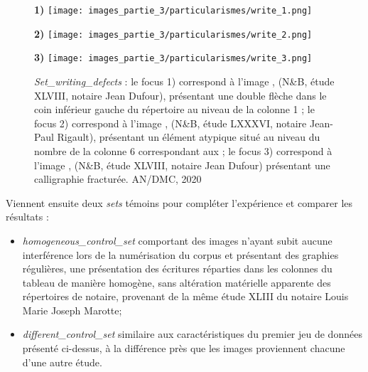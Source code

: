 \newpage
\begin{figure}[H]
    \begin{minipage}[c]{.46\linewidth} 
        \centering
        \textbf{1)}
        \texttt{[image: images\_partie\_3/particularismes/write\_1.png]}
        \end{minipage}
    \hfill%
    \begin{minipage}[c]{.46\linewidth}
        \centering
        \textbf{2)}
        \texttt{[image: images\_partie\_3/particularismes/write\_2.png]}
    \end{minipage}
    \hfill%
    \begin{minipage}[c]{.46\linewidth}
        \centering
        \textbf{3)}
        \texttt{[image: images\_partie\_3/particularismes/write\_3.png]}
    \end{minipage}
        \caption{\textit{Set\_writing\_defects} : le focus 1) correspond à l'image , (N\&B, étude XLVIII, notaire Jean Dufour), présentant une double flèche dans le coin inférieur gauche du répertoire au niveau de la colonne 1 ; le focus 2) correspond à l'image , (N\&B, étude LXXXVI, notaire Jean-Paul Rigault),  présentant un élément atypique situé au niveau du nombre  de la colonne 6 correspondant aux ; le focus 3) correspond à l'image
        , (N\&B, étude XLVIII, notaire Jean Dufour) présentant une calligraphie fracturée.
        \textcopyright AN/DMC, 2020}
    \label{fig:exemples_write}
\end{figure}
\newpage    
Viennent ensuite deux \textit{sets} témoins pour compléter l'expérience et comparer les résultats :

\begin{itemize}
    \item \textit{homogeneous\_control\_set} comportant des images n'ayant subit aucune interférence lors de la numérisation du corpus et présentant des graphies régulières, une présentation des écritures réparties dans les colonnes du tableau de manière homogène, sans altération matérielle apparente des répertoires de notaire, provenant de la même étude XLIII du notaire Louis Marie Joseph Marotte; 
    \item \textit{different\_control\_set} similaire aux caractéristiques du premier jeu de données présenté ci-dessus, à la différence près que les images proviennent chacune d'une autre étude. 
\end{itemize}


